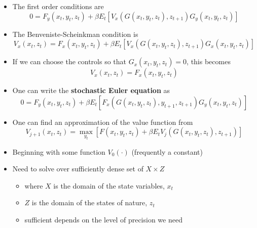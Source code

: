 \documentclass[notes=show]{beamer}
\begin{document}
\begin{frame}%


\begin{itemize}
\item The first order conditions are%
\[
0=F_{y}(x_{t},y_{t},z_{t})+\beta E_{t}\left[
V_{x}(G(x_{t},y_{t},z_{t}),z_{t+1})G_{y}(x_{t},y_{t},z_{t})\right] 
\]

\item The Benveniste-Scheinkman condition is%
\[
V_{x}(x_{t},z_{t})=F_{x}(x_{t},y_{t},z_{t})+\beta E_{t}\left[
V_{x}(G(x_{t},y_{t},z_{t}),z_{t+1})G_{x}(x_{t},y_{t},z_{t})\right] 
\]

\item If we can choose the controls so that $G_{x}(x_{t},y_{t},z_{t})=0$,
this becomes%
\[
V_{x}(x_{t},z_{t})=F_{x}(x_{t},y_{t},z_{t}) 
\]

\item One can write the \textbf{stochastic Euler equation} as%
\[
0=F_{y}(x_{t},y_{t},z_{t})+\beta E_{t}\left[
F_{x}(G(x_{t},y_{t},z_{t}),y_{t+1},z_{t+1})G_{y}(x_{t},y_{t},z_{t})\right] 
\]
\end{itemize}

\end{frame}%

\begin{frame}%


\begin{itemize}
\item One can find an approximation of the value function from%
\[
V_{j+1}(x_{t},z_{t})=\max_{y_{t}}\left[ F(x_{t},y_{t},z_{t})+\beta
E_{t}V_{j}(G(x_{t},y_{t},z_{t}),z_{t+1})\right] 
\]

\item Beginning with some function $V_{0}(\cdot )$ (frequently a constant)

\item Need to solve over sufficiently dense set of $X\times Z$

\begin{itemize}
\item where $X$ is the domain of the state variables, $x_{t}$

\item $Z$ is the domain of the states of nature, $z_{t}$

\item sufficient depends on the level of precision we need
\end{itemize}
\end{itemize}

\end{frame}%
\end{document}
